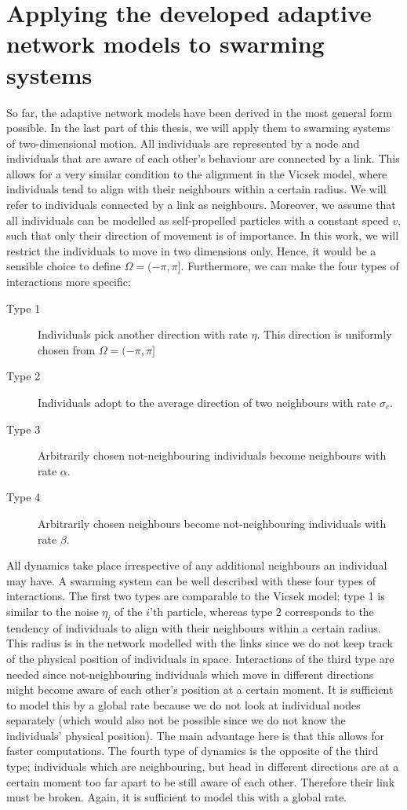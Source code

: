 \section{Applying the developed adaptive network models to swarming systems}
\label{section:applying_network_to_swarming}
So far, the adaptive network models have been derived in the most general form possible. In the last part of this thesis, we will apply them to swarming systems of two-dimensional motion. All individuals are represented by a node and individuals that are aware of each other's behaviour are connected by a link. This allows for a very similar condition to the alignment in the Vicsek model, where individuals tend to align with their neighbours within a certain radius. We will refer to individuals connected by a link as neighbours. Moreover, we assume that all individuals can be modelled as self-propelled particles with a constant speed $v$, such that only their direction of movement is of importance. In this work, we will restrict the individuals to move in two dimensions only. Hence, it would be a sensible choice to define $\Omega = (-\pi,\pi]$. Furthermore, we can make the four types of interactions more specific:

\begin{description}
	\item [Type 1] Individuals pick another direction with rate $\eta$. This direction is uniformly chosen from $\Omega = (-\pi,\pi]$
	\item [Type 2] Individuals adopt to the average direction of two neighbours with rate $\sigma_c$.
	\item [Type 3] Arbitrarily chosen not-neighbouring individuals become neighbours with rate $\alpha$.
	\item [Type 4] Arbitrarily chosen neighbours become not-neighbouring individuals with rate $\beta$.
\end{description}

All dynamics take place irrespective of any additional neighbours an individual may have. A swarming system can be well described with these four types of interactions. The first two types are comparable to the Vicsek model; type 1 is similar to the noise $\eta_i$ of the $i$'th particle, whereas type 2 corresponds to the tendency of individuals to align with their neighbours within a certain radius. This radius is in the network modelled with the links since we do not keep track of the physical position of individuals in space. Interactions of the third type are needed since not-neighbouring individuals which move in different directions might become aware of each other's position at a certain moment. It is sufficient to model this by a global rate because we do not look at individual nodes separately (which would also not be possible since we do not know the individuals' physical position). The main advantage here is that this allows for faster computations. The fourth type of dynamics is the opposite of the third type; individuals which are neighbouring, but head in different directions are at a certain moment too far apart to be still aware of each other. Therefore their link must be broken. Again, it is sufficient to model this with a global rate. 


